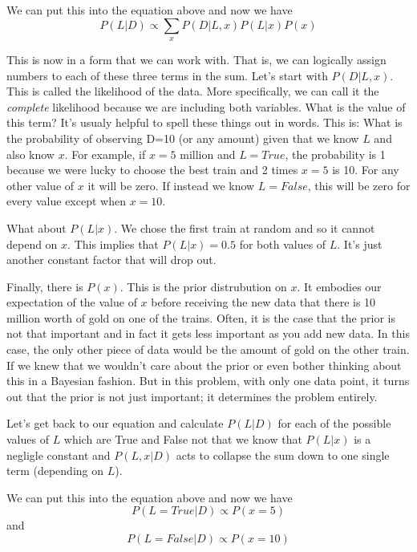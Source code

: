 \documentclass[12pt]{article}
\begin{document}
We can put this into the equation above and now we have 
\begin{equation}
P(L | D) \propto \sum_x P(D | L, x) P(L|x) P(x)
\end{equation}

This is now in a form that we can work with. That is, we can logically assign numbers to each of these three terms 
in the sum. Let's start with $P(D | L,x)$. This is called the likelihood of the data. More specifically, we can call
it the \emph{complete} likelihood because we are including both variables. What is the value of this term? It's usualy
helpful to spell these things out in words. This is: What is the probability of observing D=10 (or any amount) 
given that we know $L$ and also know $x$. For example, if $x=5$ million and $L=True$, the probability is 1 
because we were lucky to choose the best train and 2 times $x=5$ is 10. For any other value of $x$ it will be zero. 
If instead we know $L=False$, this will be zero for every value except when $x=10$. 

What about $P(L | x)$. We chose the first train at random and so it cannot depend on $x$. This implies that 
$P(L | x) =0.5$ for both values of $L$. It's just another constant factor that will drop out. 

Finally, there is $P(x)$. This is the prior distrubution on $x$. It embodies our expectation of the value of $x$ before 
receiving the new data that there is 10 million worth of gold on one of the trains. Often, it is the case that the 
prior is not that important and in fact it gets less important as you add new data. In this case, the only other piece 
of data would be the amount of gold on the other train. If we knew that we wouldn't care about the prior or even bother 
thinking about this in a Bayesian fashion. But in this problem, with only one data point, it turns out that the prior is not 
just important; it determines the problem entirely. 

Let's get back to our equation and calculate $P(L | D)$ for each of the possible values of $L$ which are True and False
not that we know that $P(L|x)$ is a negligle constant and $P(L,x | D)$ acts to collapse the sum down to one single
term (depending on $L$). 

We can put this into the equation above and now we have
\begin{equation}
P(L= True | D) \propto P(x = 5)
\end{equation} 
and 
\begin{equation}
P(L= False | D) \propto P(x = 10)
\end{equation}
 
\end{document}
